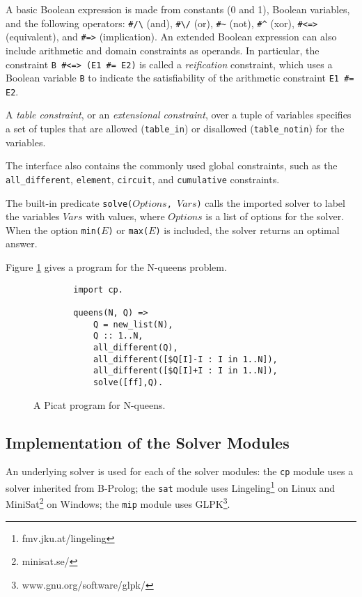 \documentclass{new_tlp}
\begin{document}
A basic Boolean expression is made from constants (0 and 1), Boolean variables, and the following operators: \verb+#/\+ (and), \verb+#\/+ (or), \verb+#~+ (not), \verb+#^+ (xor), \verb+#<=>+ (equivalent), and \verb+#=>+ (implication).  An extended Boolean expression can also include arithmetic and domain constraints as operands. In particular, the constraint \verb+B #<=> (E1 #= E2)+ is called a {\it reification} constraint, which uses a Boolean variable {\tt B} to indicate the satisfiability of the arithmetic constraint \verb+E1 #= E2+.

A \emph{table constraint}, or an \emph{extensional constraint}, over a tuple of variables specifies a set of tuples that are allowed ({\tt table\_in}) or disallowed ({\tt table\_notin}) for the variables.

The interface also contains the commonly used global constraints, such as the {\tt all\_different}, {\tt element}, {\tt circuit}, and {\tt cumulative} constraints.

The built-in predicate \texttt{solve($Options$, $Vars$)} calls the imported solver to label the variables $Vars$ with values, where $Options$ is a list of options for the solver. When the option {\tt min($E$)} or {\tt max($E$)} is included, the solver returns an optimal answer.

Figure \ref{fig:queens} gives a program for the N-queens problem.
\begin{figure}[hbt]
\begin{center}
\begin{verbatim}
        import cp.

        queens(N, Q) =>
            Q = new_list(N),
            Q :: 1..N,
            all_different(Q),
            all_different([$Q[I]-I : I in 1..N]),
            all_different([$Q[I]+I : I in 1..N]),
            solve([ff],Q).
\end{verbatim}
\end{center}
\caption{\label{fig:queens}A Picat program for N-queens.}
\end{figure}
\vspace*{-3mm}

\subsection{Implementation of the Solver Modules}
An underlying solver is used for each of the solver modules: the {\tt cp} module uses a solver inherited from B-Prolog; the {\tt sat} module uses Lingeling\footnote{fmv.jku.at/lingeling} on Linux and MiniSat\footnote{minisat.se/} on Windows; the {\tt mip} module uses GLPK\footnote{www.gnu.org/software/glpk/}.
\end{document}
